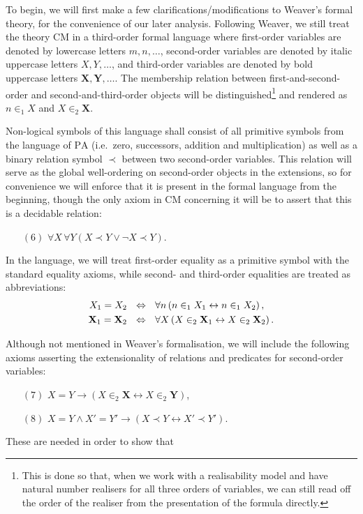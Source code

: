 \documentclass[11pt]{article}
\theoremstyle{plain}
\theoremstyle{definition}
\begin{document}
To begin, we will first make a few clarifications/modifications to Weaver's formal theory, for the convenience of our later analysis. Following Weaver, we still treat the theory $\mathrm{CM}$ in a third-order formal language where first-order variables are denoted by lowercase letters $m, n, \ldots$, second-order variables are denoted by italic uppercase letters $X, Y, \ldots$, and third-order variables are denoted by bold uppercase letters $\mathbf{X}, \mathbf{Y}, \ldots$. The membership relation between first-and-second-order and second-and-third-order objects will be distinguished\footnote{This is done so that, when we work with a realisability model and have natural number realisers for all three orders of variables, we can still read off the order of the realiser from the presentation of the formula directly.} and rendered as $n \in_1 X$ and $X \in_2 \mathbf{X}$.

Non-logical symbols of this language shall consist of all primitive symbols from the language of $\mathrm{PA}$ (i.e.\ zero, successors, addition and multiplication) as well as a binary relation symbol $\prec$ between two second-order variables. This relation will serve as the global well-ordering on second-order objects in the extensions, so for convenience we will enforce that it is present in the formal language from the beginning, though the only axiom in $\mathrm{CM}$ concerning it will be to assert that this is a decidable relation:
\begin{enumerate}
    \item[$\left(6\right)$] $\forall X \, \forall Y \left(X \prec Y \lor \neg X \prec Y\right)$.
\end{enumerate}

In the language, we will treat first-order equality as a primitive symbol with the standard equality axioms, while second- and third-order equalities are treated as abbreviations:
\begin{align*}
    X_1 = X_2 \ \                    & \ratio\Leftrightarrow \ \ \forall n \left(n \in_1 X_1 \leftrightarrow n \in_1 X_2\right),                   \\
    \mathbf{X}_1 = \mathbf{X}_2 \ \  & \ratio\Leftrightarrow \ \ \forall X \left(X \in_2 \mathbf{X}_1 \leftrightarrow X \in_2 \mathbf{X}_2\right).
\end{align*}

Although not mentioned in Weaver's formalisation, we will include the following axioms asserting the extensionality of relations and predicates for second-order variables:
\begin{enumerate}
    \item[$\left(7\right)$] $X = Y \rightarrow \left(X \in_2 \mathbf{X} \leftrightarrow X \in_2 \mathbf{Y}\right)$,
    \item[$\left(8\right)$] $X = Y \land X' = Y' \rightarrow \left(X \prec Y \leftrightarrow X' \prec Y'\right)$.
\end{enumerate}
These are needed in order to show that
\end{document}
